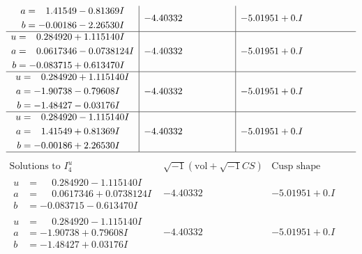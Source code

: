 \documentclass[1p]{elsarticle_modified}
\theoremstyle{definition}
\newcommand{\I}{\sqrt{-1}}
\begin{document}
$$\begin{array}{c|c|c}
\begin{aligned}
a &= \phantom{-}1.41549 - 0.81369 I \\
b &= -0.00186 - 2.26530 I\end{aligned}
 & -4.40332\phantom{ +0.000000I} & -5.01951 + 0. I\phantom{ +0.000000I} \\ \hline\begin{aligned}
u &= \phantom{-}0.284920 + 1.115140 I \\
a &= \phantom{-}0.0617346 - 0.0738124 I \\
b &= -0.083715 + 0.613470 I\end{aligned}
 & -4.40332\phantom{ +0.000000I} & -5.01951 + 0. I\phantom{ +0.000000I} \\ \hline\begin{aligned}
u &= \phantom{-}0.284920 + 1.115140 I \\
a &= -1.90738 - 0.79608 I \\
b &= -1.48427 - 0.03176 I\end{aligned}
 & -4.40332\phantom{ +0.000000I} & -5.01951 + 0. I\phantom{ +0.000000I} \\ \hline\begin{aligned}
u &= \phantom{-}0.284920 - 1.115140 I \\
a &= \phantom{-}1.41549 + 0.81369 I \\
b &= -0.00186 + 2.26530 I\end{aligned}
 & -4.40332\phantom{ +0.000000I} & -5.01951 + 0. I\phantom{ +0.000000I}\\
 \hline 
 \end{array}$$\newpage$$\begin{array}{c|c|c}  
\text{Solutions to }I^u_{4}& \I (\text{vol} + \sqrt{-1}CS) & \text{Cusp shape}\\
 \hline 
\begin{aligned}
u &= \phantom{-}0.284920 - 1.115140 I \\
a &= \phantom{-}0.0617346 + 0.0738124 I \\
b &= -0.083715 - 0.613470 I\end{aligned}
 & -4.40332\phantom{ +0.000000I} & -5.01951 + 0. I\phantom{ +0.000000I} \\ \hline\begin{aligned}
u &= \phantom{-}0.284920 - 1.115140 I \\
a &= -1.90738 + 0.79608 I \\
b &= -1.48427 + 0.03176 I\end{aligned}
 & -4.40332\phantom{ +0.000000I} & -5.01951 + 0. I\phantom{ +0.000000I} \\ \hline\begin{aligned}

\end{aligned}
\end{array}$$
\end{document}
